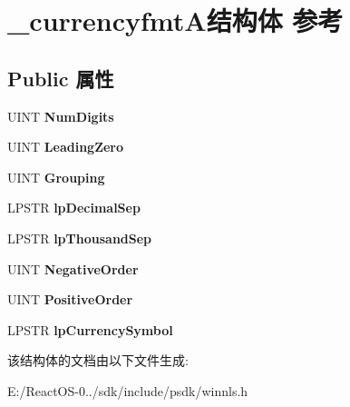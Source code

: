 \hypertarget{struct__currencyfmt_a}{}\section{\+\_\+currencyfmt\+A结构体 参考}
\label{struct__currencyfmt_a}
\subsection*{Public 属性}
\begin{DoxyCompactItemize}
\item 
\mbox{\label{struct__currencyfmt_a_adb23667785d273f417829d96a7c87160}} 
U\+I\+NT {\bfseries Num\+Digits}
\item 
\mbox{\label{struct__currencyfmt_a_a2712f689ad06fad5f1213d359ad84d70}} 
U\+I\+NT {\bfseries Leading\+Zero}
\item 
\mbox{\label{struct__currencyfmt_a_a3e13a325261362bd51e9d5fd07eea344}} 
U\+I\+NT {\bfseries Grouping}
\item 
\mbox{\label{struct__currencyfmt_a_a8ce58f43a3a3d41a9539caaf75c1fb88}} 
L\+P\+S\+TR {\bfseries lp\+Decimal\+Sep}
\item 
\mbox{\label{struct__currencyfmt_a_a489fc6ea9a32627d71292221a69e9ab7}} 
L\+P\+S\+TR {\bfseries lp\+Thousand\+Sep}
\item 
\mbox{\label{struct__currencyfmt_a_a955cda99de6cbb1eda9edb8f572ff337}} 
U\+I\+NT {\bfseries Negative\+Order}
\item 
\mbox{\label{struct__currencyfmt_a_a8f59cc2471a7c0a50d1e9e6a0baed83a}} 
U\+I\+NT {\bfseries Positive\+Order}
\item 
\mbox{\label{struct__currencyfmt_a_ab750dcc7ee024db608308bb29ff6446a}} 
L\+P\+S\+TR {\bfseries lp\+Currency\+Symbol}
\end{DoxyCompactItemize}


该结构体的文档由以下文件生成\+:\begin{DoxyCompactItemize}
\item 
E\+:/\+React\+O\+S-\/0../sdk/include/psdk/winnls.\+h\end{DoxyCompactItemize}
